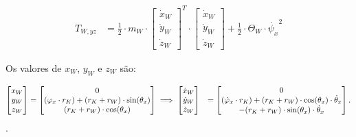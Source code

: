 \begin{equation*}
    \begin{aligned}
        T_{W,yz} & = \frac{1}{2} \cdot m_W \cdot 
        \begin{bmatrix}
            \dot x_W \\
            \dot y_W \\
            \dot z_W
        \end{bmatrix}^T
        \cdot
        \begin{bmatrix}
            \dot x_W \\
            \dot y_W \\
            \dot z_W
        \end{bmatrix}
        +
        \frac{1}{2} \cdot \Theta_W \cdot \dot {\psi_x}^2
    \end{aligned}
\end{equation*}

Os valores de $x_W$, $y_W$ e $z_W$ são:

\begin{equation*}
\scalebox{0.85}{$
    \begin{aligned}
        \begin{bmatrix}
            x_W \\
            y_W \\
            z_W
        \end{bmatrix} 
        & =
        \begin{bmatrix}
            0 \\
            (\varphi_x \cdot r_K ) + (r_K + r_W) \cdot \sin(\theta_x) \\
            (r_K + r_W) \cdot \cos(\theta_x)
        \end{bmatrix}
        \implies
        \begin{bmatrix}
            \dot x_W \\
            \dot y_W \\
            \dot z_W
        \end{bmatrix}
        & =
        \begin{bmatrix}
            0 \\
            (\dot \varphi_x \cdot r_K ) + (r_K + r_W) \cdot \cos({\theta_x}) \cdot \dot \theta_x \\
            - (r_K + r_W) \cdot \sin({\theta_x}) \cdot \dot \theta_x
        \end{bmatrix}.
    \end{aligned}
    $}
\end{equation*}.

